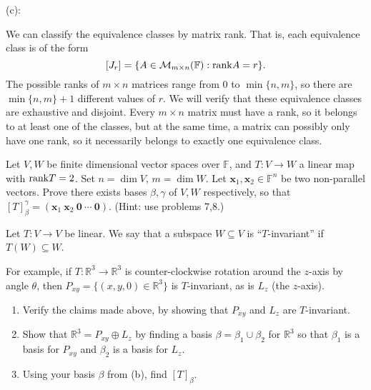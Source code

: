 \documentclass{eh-homework}
\begin{document}
\begin{question}{9}
        \medskip

        (c):

        We can classify the equivalence classes by matrix rank. That is, each equivalence class is of the form
        \[
            [J_r] = \{ A \in \mathcal{M} _{m\times n}(\mathbb{F}) : \mathrm{rank} A = r\}.
        \]
        The possible ranks of \(m\times n\) matrices range from \(0\) to \(\min \{ n,m \}\), so there are \(\min \{ n,m \} + 1\) different values of \(r\). We will verify that these equivalence classes are exhaustive and disjoint. Every \(m \times n\) matrix must have a rank, so it belongs to at least one of the classes, but at the same time, a matrix can possibly only have one rank, so it necessarily belongs to exactly one equivalence class.
    \end{question}

    \begin{question}{10}
        Let \( V, W \) be finite dimensional vector spaces over \( \mathbb{F} \), and \( T : V \to W \) a linear map with \(\mathrm{rank} T = 2\). Set \( n = \dim V \), \( m = \dim W \). Let \( \mathbf{x}_1, \mathbf{x}_2 \in \mathbb{F}^n \) be two non-parallel vectors. Prove there exists bases \( \beta, \gamma \) of \( V, W \) respectively, so that \( [T]_\beta^\gamma = (\mathbf{x}_1 \ \mathbf{x}_2 \ \mathbf{0} \ \cdots \ \mathbf{0}) \). (Hint: use problems 7,8.)
    \end{question}

    \begin{question}{11}
        Let \( T : V \to V \) be linear. We say that a subspace \( W \subseteq V \) is ``\( T \)-invariant'' if \( T(W) \subseteq W \).

        For example, if \( T : \mathbb{R}^3 \to \mathbb{R}^3 \) is counter-clockwise rotation around the \( z \)-axis by angle \( \theta \), then \( P_{xy} = \{(x, y, 0) \in \mathbb{R}^3\} \) is \( T \)-invariant, as is \( L_z \) (the \( z \)-axis).

        \begin{enumerate}
            \item Verify the claims made above, by showing that \( P_{xy} \) and \( L_z \) are \( T \)-invariant.
            \item Show that \( \mathbb{R}^3 = P_{xy} \oplus L_z \) by finding a basis \( \beta = \beta_1 \cup \beta_2 \) for \( \mathbb{R}^3 \) so that \( \beta_1 \) is a basis for \( P_{xy} \) and \( \beta_2 \) is a basis for \( L_z \).
            \item Using your basis \( \beta \) from (b), find \( [T]_\beta \).
        \end{enumerate}
    \end{question}
\end{document}
